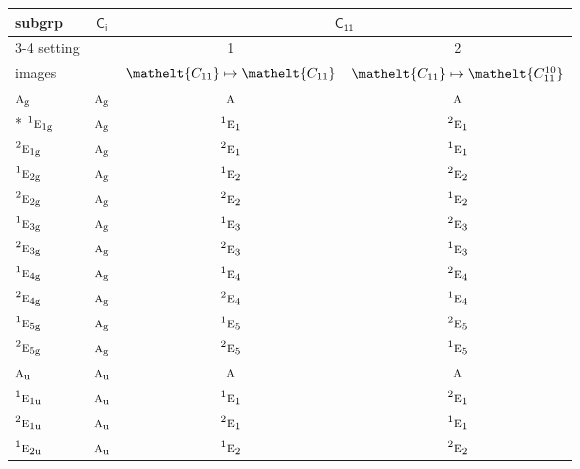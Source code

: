 \documentclass[10pt,a4paper]{article}
\numberwithin{equation}{section}
\newcommand{\eltfont}[1]{{\let\sigma\eltsigma\mathelt{#1}}}
\newcommand{\grp}[1]{\mathsf{#1}}
\newcommand{\irr}[1]{\text{\normalfont\scshape #1}}
\newcommand{\conjpair}[1]{{}^{#1}}
\newcommand{\cls}[1]{\eltfont{#1}}
\newcommand{\ptag}[1]{\mathrm{#1}}
\begin{document}
{\small\begin{longtable}{@{}lccc@{}}\toprule
subgrp & \href{S2.pdf}{$\grp{C_{i}}$} & \multicolumn{2}{c}{\href{C11.pdf}{$\grp{C_{11}}$}}\\\cmidrule(lr){3-4}
setting &  & 1 & 2\\
images &  & {\scriptsize $\cls{C_{11}} \mapsto \cls{C_{11}}$} & {\scriptsize $\cls{C_{11}} \mapsto \cls{C_{11}^{10}}$}\\\midrule\endhead
\bottomrule\endfoot\endlastfoot
$\irr{a}_{\ptag{g}}$ & $\irr{a}_{\ptag{g}}$ & $\irr{a}$ & $\irr{a}$\\*
$\conjpair{1}\irr{e}_{1\ptag{g}}$ & $\irr{a}_{\ptag{g}}$ & $\conjpair{1}\irr{e}_{1}$ & $\conjpair{2}\irr{e}_{1}$\\
$\conjpair{2}\irr{e}_{1\ptag{g}}$ & $\irr{a}_{\ptag{g}}$ & $\conjpair{2}\irr{e}_{1}$ & $\conjpair{1}\irr{e}_{1}$\\
$\conjpair{1}\irr{e}_{2\ptag{g}}$ & $\irr{a}_{\ptag{g}}$ & $\conjpair{1}\irr{e}_{2}$ & $\conjpair{2}\irr{e}_{2}$\\
$\conjpair{2}\irr{e}_{2\ptag{g}}$ & $\irr{a}_{\ptag{g}}$ & $\conjpair{2}\irr{e}_{2}$ & $\conjpair{1}\irr{e}_{2}$\\
$\conjpair{1}\irr{e}_{3\ptag{g}}$ & $\irr{a}_{\ptag{g}}$ & $\conjpair{1}\irr{e}_{3}$ & $\conjpair{2}\irr{e}_{3}$\\
$\conjpair{2}\irr{e}_{3\ptag{g}}$ & $\irr{a}_{\ptag{g}}$ & $\conjpair{2}\irr{e}_{3}$ & $\conjpair{1}\irr{e}_{3}$\\
$\conjpair{1}\irr{e}_{4\ptag{g}}$ & $\irr{a}_{\ptag{g}}$ & $\conjpair{1}\irr{e}_{4}$ & $\conjpair{2}\irr{e}_{4}$\\
$\conjpair{2}\irr{e}_{4\ptag{g}}$ & $\irr{a}_{\ptag{g}}$ & $\conjpair{2}\irr{e}_{4}$ & $\conjpair{1}\irr{e}_{4}$\\
$\conjpair{1}\irr{e}_{5\ptag{g}}$ & $\irr{a}_{\ptag{g}}$ & $\conjpair{1}\irr{e}_{5}$ & $\conjpair{2}\irr{e}_{5}$\\
$\conjpair{2}\irr{e}_{5\ptag{g}}$ & $\irr{a}_{\ptag{g}}$ & $\conjpair{2}\irr{e}_{5}$ & $\conjpair{1}\irr{e}_{5}$\\
$\irr{a}_{\ptag{u}}$ & $\irr{a}_{\ptag{u}}$ & $\irr{a}$ & $\irr{a}$\\
$\conjpair{1}\irr{e}_{1\ptag{u}}$ & $\irr{a}_{\ptag{u}}$ & $\conjpair{1}\irr{e}_{1}$ & $\conjpair{2}\irr{e}_{1}$\\
$\conjpair{2}\irr{e}_{1\ptag{u}}$ & $\irr{a}_{\ptag{u}}$ & $\conjpair{2}\irr{e}_{1}$ & $\conjpair{1}\irr{e}_{1}$\\
$\conjpair{1}\irr{e}_{2\ptag{u}}$ & $\irr{a}_{\ptag{u}}$ & $\conjpair{1}\irr{e}_{2}$ & $\conjpair{2}\irr{e}_{2}$\\

\end{longtable}}
\end{document}
